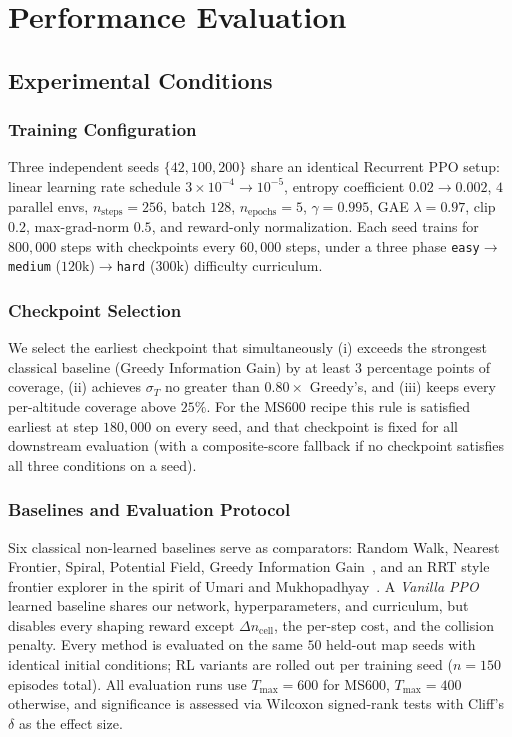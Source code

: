 \documentclass[runningheads]{llncs}
\begin{document}
\section{Performance Evaluation}

\subsection{Experimental Conditions}

\subsubsection{Training Configuration}
Three independent seeds $\{42,100,200\}$ share an identical Recurrent PPO setup: linear learning rate schedule $3{\times}10^{-4}\!\to\!10^{-5}$, entropy coefficient $0.02\!\to\!0.002$, $4$ parallel envs, $n_{\text{steps}}{=}256$, batch $128$, $n_{\text{epochs}}{=}5$, $\gamma{=}0.995$, GAE $\lambda{=}0.97$, clip $0.2$, max-grad-norm $0.5$, and reward-only normalization. Each seed trains for $800{,}000$ steps with checkpoints every $60{,}000$ steps, under a three phase \texttt{easy}$\to$\texttt{medium} ($120$k)$\to$\texttt{hard} ($300$k) difficulty curriculum.

\subsubsection{Checkpoint Selection}
We select the earliest checkpoint that simultaneously (i) exceeds the strongest classical baseline (Greedy Information Gain) by at least $3$ percentage points of coverage, (ii) achieves $\sigma_T$ no greater than $0.80\!\times\!$ Greedy's, and (iii) keeps every per-altitude coverage above $25\%$. For the MS600 recipe this rule is satisfied earliest at step $180{,}000$ on every seed, and that checkpoint is fixed for all downstream evaluation (with a composite-score fallback if no checkpoint satisfies all three conditions on a seed).

\subsubsection{Baselines and Evaluation Protocol}
Six classical non-learned baselines serve as comparators: Random Walk, Nearest Frontier, Spiral, Potential Field, Greedy Information Gain~\cite{placed2023survey}, and an RRT style frontier explorer in the spirit of Umari and Mukhopadhyay~\cite{placed2023survey}. A \emph{Vanilla PPO} learned baseline shares our network, hyperparameters, and curriculum, but disables every shaping reward except $\Delta n_{\text{cell}}$, the per-step cost, and the collision penalty. Every method is evaluated on the same $50$ held-out map seeds with identical initial conditions; RL variants are rolled out per training seed ($n\!=\!150$ episodes total). All evaluation runs use $T_{\max}\!=\!600$ for MS600, $T_{\max}\!=\!400$ otherwise, and significance is assessed via Wilcoxon signed-rank tests with Cliff's $\delta$ as the effect size.
\end{document}
